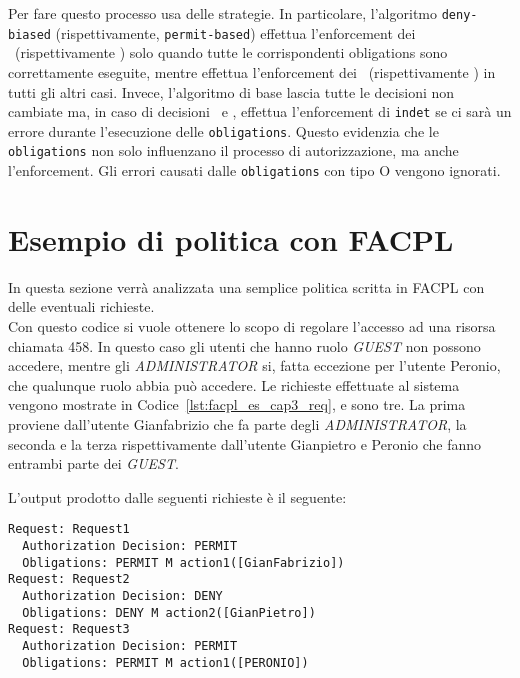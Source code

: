 Per fare questo processo usa delle strategie. In particolare, l'algoritmo \texttt{deny-biased} (rispettivamente, \texttt{permit-based}) effettua l'enforcement dei \permit \ (rispettivamente \deny) solo quando tutte le corrispondenti obligations sono correttamente eseguite, mentre effettua l'enforcement dei \deny \  (rispettivamente \permit) in tutti gli altri casi. Invece, l'algoritmo di base lascia tutte le decisioni non cambiate ma, in caso di decisioni \permit \ e \deny, effettua l'enforcement di \texttt{indet} se ci sarà un errore durante l'esecuzione delle \texttt{obligations}. Questo evidenzia che le \texttt{obligations} non solo influenzano il processo di autorizzazione, ma anche l'enforcement. Gli errori causati dalle \texttt{obligations} con tipo O vengono ignorati.

\section{Esempio di politica con FACPL} %
\label{sec:esempio_di_politica_con_facpl}
In questa sezione verrà analizzata una semplice politica scritta in FACPL con delle eventuali richieste.\\
 
Con questo codice si vuole ottenere lo scopo di regolare l'accesso ad una risorsa chiamata 458. In questo caso gli utenti che hanno ruolo \textit{GUEST} non possono accedere, mentre gli \textit{ADMINISTRATOR} si, fatta eccezione per l'utente Peronio, che qualunque ruolo abbia può accedere.
Le richieste effettuate al sistema vengono mostrate in Codice~\ref{lst:facpl_es_cap3_req}, e sono tre. La prima proviene dall'utente Gianfabrizio che fa parte degli \textit{ADMINISTRATOR}, la seconda e la terza rispettivamente dall'utente Gianpietro e Peronio che fanno entrambi parte dei \textit{GUEST}. 
 
L'output prodotto dalle seguenti richieste è il seguente:
\begin{verbatim}
Request: Request1
  Authorization Decision: PERMIT 
  Obligations: PERMIT M action1([GianFabrizio])
Request: Request2
  Authorization Decision: DENY 
  Obligations: DENY M action2([GianPietro])
Request: Request3
  Authorization Decision: PERMIT 
  Obligations: PERMIT M action1([PERONIO])
\end{verbatim}
